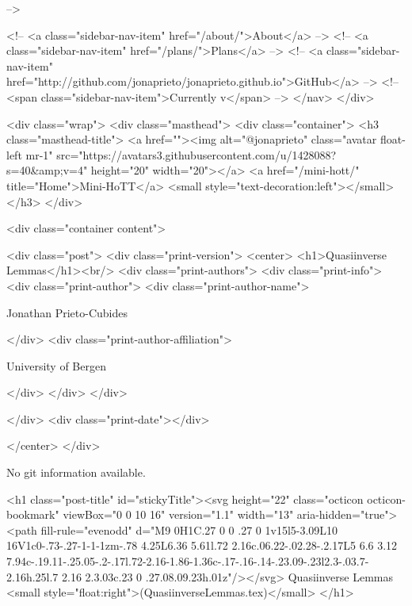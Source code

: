       
     -->

    <!-- <a class="sidebar-nav-item" href="/about/">About</a> -->
    <!-- <a class="sidebar-nav-item" href="/plans/">Plans</a> -->
    <!-- <a class="sidebar-nav-item" href="http://github.com/jonaprieto/jonaprieto.github.io">GitHub</a> -->
    <!-- <span class="sidebar-nav-item">Currently v</span> -->
  </nav>
</div>

    <div class="wrap">
      <div class="masthead">
        <div class="container">
          <h3 class="masthead-title">
            <a href=""><img alt="@jonaprieto" class="avatar float-left mr-1" src="https://avatars3.githubusercontent.com/u/1428088?s=40&amp;v=4" height="20" width="20"></a>
            <a href="/mini-hott/" title="Home">Mini-HoTT</a>
            <small style="text-decoration:left"></small>
          </h3>
        </div>
      
      <div class="container content">
        







<div class="post">
  <div class="print-version">
    <center>
      <h1>Quasiinverse Lemmas</h1><br/>
        <div class="print-authors">
          <div class="print-info">
            <div class="print-author">
              <div class="print-author-name">
                
                  Jonathan Prieto-Cubides
                
              </div>
              <div class="print-author-affiliation">
                
                  University of Bergen
                
                </div>
            </div>
          </div>
          
          
        </div>
        <div class="print-date"></div>
        
        
    </center>
  </div>

  
  No git information available.
  

  <h1 class="post-title" id="stickyTitle"><svg height="22" class="octicon octicon-bookmark" viewBox="0 0 10 16" version="1.1" width="13" aria-hidden="true"><path fill-rule="evenodd" d="M9 0H1C.27 0 0 .27 0 1v15l5-3.09L10 16V1c0-.73-.27-1-1-1zm-.78 4.25L6.36 5.61l.72 2.16c.06.22-.02.28-.2.17L5 6.6 3.12 7.94c-.19.11-.25.05-.2-.17l.72-2.16-1.86-1.36c-.17-.16-.14-.23.09-.23l2.3-.03.7-2.16h.25l.7 2.16 2.3.03c.23 0 .27.08.09.23h.01z"/></svg> Quasiinverse Lemmas <small style="float:right">(QuasiinverseLemmas.tex)</small>
  </h1>


